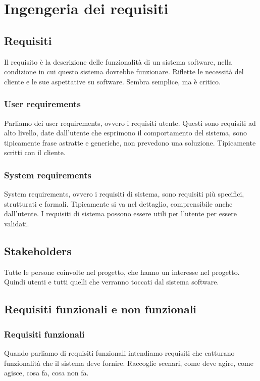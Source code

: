 \chapter{Ingengeria dei requisiti}
\section{Requisiti}
Il requisito è la descrizione delle funzionalità di un sistema software,
nella condizione in cui questo sistema dovrebbe funzionare. Riflette le 
necessità del cliente e le sue aspettative su software. Sembra semplice, ma 
è critico.

\subsection{User requirements}
Parliamo dei user requirements, ovvero i requisiti utente. Questi sono
requisiti ad alto livello, date dall'utente che esprimono il comportamento del sistema,
sono tipicamente frase astratte e generiche, non prevedono una soluzione.
Tipicamente scritti con il cliente.

\subsection{System requirements}
System requirements, ovvero i requisiti di sistema, sono requisiti più specifici,
strutturati e formali. Tipicamente si va nel dettaglio, comprensibile anche 
dall'utente.
I requisiti di sistema possono essere utili per l'utente per essere validati.

\section{Stakeholders}
Tutte le persone coinvolte nel progetto,
che hanno un interesse nel progetto. Quindi utenti e tutti quelli che verranno 
toccati dal sistema software.

\section{Requisiti funzionali e non funzionali}
\subsection{Requisiti funzionali}
Quando parliamo di requisiti funzionali intendiamo requisiti che catturano 
funzionalità che il sistema deve fornire. Raccoglie scenari, come deve agire, 
come agisce, cosa fa, cosa non fa.

